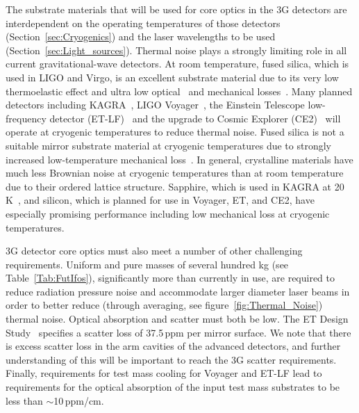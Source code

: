 The substrate materials that will be used for core optics in the 3G detectors are interdependent on the operating temperatures of those detectors (Section~\ref{sec:Cryogenics}) and the laser wavelengths to be used (Section~\ref{sec:Light_sources}). 
Thermal noise plays a strongly limiting role in all current gravitational-wave detectors. At room temperature, fused silica, which is used in LIGO and Virgo, is an excellent substrate material due to its very low thermoelastic effect and ultra low optical~\cite{GEO_Absorption} and mechanical losses~\cite{Ageev_2004}. Many planned detectors
including KAGRA~\cite{KAGRA2013}, LIGO Voyager~\cite{VoyagerDCC2018}, the Einstein Telescope low-frequency detector (ET-LF)~\cite{ET2011} and the upgrade to Cosmic Explorer (CE2)~\cite{CosmicExplorer2017} will operate at cryogenic temperatures to reduce thermal noise. 
Fused silica is not a suitable mirror substrate material at cryogenic temperatures due to strongly increased low-temperature mechanical loss~\cite{Travasso_2007}.
In general, crystalline materials have much less Brownian noise at cryogenic temperatures than at room temperature due to their ordered lattice structure.
Sapphire, which is used in KAGRA at 20\,K~\cite{Hirose_2014a}, and silicon, which is planned for use in Voyager, ET, and CE2, have especially promising performance including low mechanical loss at cryogenic temperatures. 

3G detector core optics must also meet a number of other challenging requirements. Uniform and pure masses of several hundred kg (see Table~\ref{Tab:FutIfos}), significantly more than currently in use, are required to reduce radiation pressure noise and accommodate larger diameter laser beams in order to better reduce (through averaging, see figure~\ref{fig:Thermal_Noise}) thermal noise. Optical absorption and scatter must both be low. The ET Design Study~\cite{ET2011} specifies a scatter loss of 37.5\,ppm per mirror surface. We note that there is excess scatter loss in the arm cavities of the advanced detectors, and further understanding of this will be important to reach the 3G scatter requirements. Finally, requirements for test mass cooling for Voyager and ET-LF lead to requirements for the optical absorption of the input test mass substrates to be less than $\sim$10\,ppm/cm.

